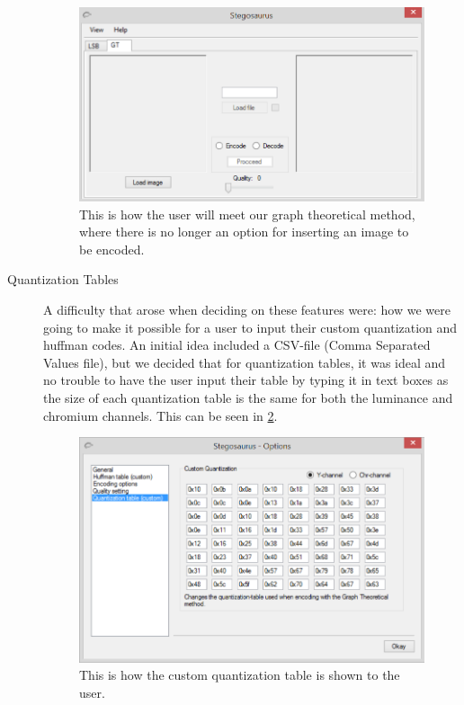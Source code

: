 \begin{description}
\begin{figure}
	\centering
	\includegraphics[width=1\textwidth]{figures/StegoGTAMain.png}
	\caption{This is how the user will meet our graph theoretical method, where there is no longer an option for inserting an image to be encoded.}
	\label{fig:StegoGTAMain}
\end{figure}

\item[Quantization Tables]
A difficulty that arose when deciding on these features were: how we were going to make it possible for a user to input their custom quantization and huffman codes.
An initial idea included a CSV-file (Comma Separated Values file), but we decided that for quantization tables, it was ideal and no trouble to have the user input their table by typing it in text boxes as the size of each quantization table is the same for both the luminance and chromium channels.
This can be seen in \ref{fig:StegoOptionQuant}.

\begin{figure}
	\centering
	\includegraphics[width=1\textwidth]{figures/StegoOptionQuant.png}
	\caption{This is how the custom quantization table is shown to the user.}
	\label{fig:StegoOptionQuant}
\end{figure}


\end{description}

